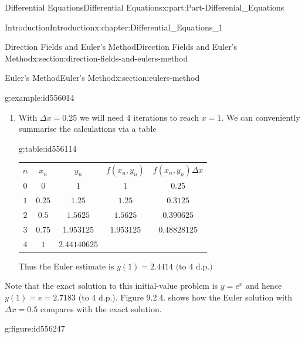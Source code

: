 \documentclass[oneside,10pt,]{book}
\newcommand{\tabularfont}{\relax}
\numberwithin{equation}{section}
\newcommand{\hrulethin}  {\noalign{\hrule height 0.04em}}
\newcommand{\amp}{&}
\begin{document}
\begin{partptx}{Differential Equations}{}{Differential Equations}{}{}{x:part:Part-Differenial_Equations}
\begin{chapterptx}{Introduction}{}{Introduction}{}{}{x:chapter:Differential_Equations_1}
\begin{sectionptx}{Direction Fields and Euler's Method}{}{Direction Fields and Euler's Method}{}{}{x:section:direction-fields-and-eulers-method}
\begin{sectionptx}{Euler's Method}{}{Euler's Method}{}{}{x:section:eulers-method}
\begin{example}{}{g:example:id556014}
\begin{enumerate}[label=\alph*.]
\begin{align*}
y_1 \amp =y_0+f(x_0,y_0)\Delta x\\
\amp = 1+f(0,1)\times 0.5\\
\amp = 1.5
\end{align*}
%
 Now complete the second iteration \par
%
\begin{align*}
x_2 \amp =x_1+\Delta x=0.5+0.5=1\\
y_2 \amp =y_1+f(x_1,y_1)\Delta x\\
\amp = 1.5+f(0.5,1.5)\times 0.5\\
\amp = 1.5+1.5\times 0.5\\
\amp = 2.25
\end{align*}
%
 Thus the Euler estimate is \(y(1)=2.25\).%
\item{}With \(\Delta x=0.25\) we will need 4 iterations to reach \(x=1\). We can conveniently summarise the calculations via a table \begin{tableptx}{\textbf{}}{g:table:id556114}{}%
\centering%
{\tabularfont%
\begin{tabular}{ccccc}
\textbf{\(n\)}&\textbf{\(x_n\)}&\textbf{\(y_n\)}&\textbf{\(f(x_n,y_n)\)}&\textbf{\(f(x_n,y_n)\Delta x\)}\tabularnewline\hrulethin
\(0\)&\(0\)&\(1\)&\(1\)&\(0.25\)\tabularnewline[0pt]
\(1\)&\(0.25\)&\(1.25\)&\(1.25\)&\(0.3125\)\tabularnewline[0pt]
\(2\)&\(0.5\)&\(1.5625\)&\(1.5625\)&\(0.390625\)\tabularnewline[0pt]
\(3\)&\(0.75\)&\(1.953125\)&\(1.953125\)&\(0.48828125\)\tabularnewline[0pt]
\(4\)&\(1\)&\(2.44140625\)&\(\)&
\end{tabular}
}%
\end{tableptx}%
 Thus the Euler estimate is \(y(1)=2.4414 \textrm{ (to 4 d.p.)}\)%
\end{enumerate}
%
\par
Note that the exact solution to this initial-value problem is \(y=e^x\) and hence \(y(1)=e=2.7183\) (to 4 d.p.). Figure 9.2.4. shows how the Euler solution with \(\Delta x=0.5\) compares with the exact solution. \begin{figureptx}{}{g:figure:id556247}{}%
\begin{image}{0.125}{0.75}{0.125}%

\end{image}
\end{figureptx}
\end{example}
\end{sectionptx}
\end{sectionptx}
\end{chapterptx}
\end{partptx}
\end{document}
